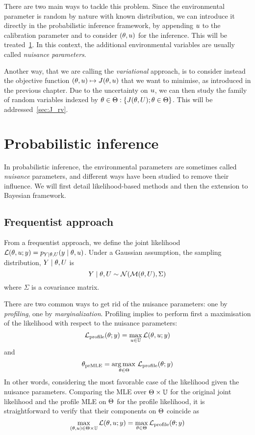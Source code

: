 \documentclass[../../Main_ManuscritThese.tex]{subfiles}
\begin{document}
There are two main ways to tackle this problem. Since the environmental parameter is random by nature with known distribution, we can introduce it directly in the probabilistic inference framework, by appending $u$ to the calibration parameter and to consider $(\theta, u)$ for the inference. This will be treated~\cref{sec:nuisance_parameters}. In this context, the additional environmental variables are usually called \emph{nuisance parameters}. 

Another way, that we are calling the \emph{variational} approach, is to consider instead the objective function $(\theta, u) \mapsto J(\theta, u)$ that we want to minimise, as introduced in the previous chapter. Due to the uncertainty on $u$, we can then study the family of random variables indexed by $\theta \in \Theta: \{J(\theta, U); \theta\in\Theta\}$. This will be addressed~\cref{sec:J_rv}.

\section{Probabilistic inference}
\label{sec:nuisance_parameters}
In probabilistic inference, the environmental parameters are sometimes called \emph{nuisance} parameters, and different ways have been studied to remove their influence.
We will first detail likelihood-based methods and then the extension to Bayesian framework.
\subsection{Frequentist approach}
From a frequentist approach, we define the joint likelihood $\mathcal{L}(\theta, u ;y) = p_{Y\mid \theta,U}(y \mid \theta, u)$.
Under a Gaussian assumption, the sampling distribution, $Y\mid \theta, U$ is 
\begin{equation}
Y \mid \theta, U \sim \mathcal{N}(\mathcal{M}(\theta, U), \Sigma)
\end{equation}
where $\Sigma$ is a covariance matrix.

There are two common ways to get rid of the nuisance parameters: one by \emph{profiling}, one by \emph{marginalization}.
Profiling implies to perform first a maximisation of the likelihood with respect to the nuisance parameters:
\begin{equation}
  \label{eq:def_profile_lik}
  \mathcal{L}_{\mathrm{profile}}(\theta;y) = \max_{u \in \mathbb{U}} \mathcal{L}(\theta,u;y)
\end{equation}
and
\begin{equation}
  {\theta}_{\mathrm{prMLE}} = \operatorname*{arg\,max \,}_{\theta\in\Theta} \mathcal{L}_{\mathrm{profile}}(\theta;y)
\end{equation}
In other words, considering the most favorable case of the likelihood given the nuisance parameters.
Comparing the MLE over $\Theta \times \mathbb{U}$ for the original joint likelihood and the profile MLE on $\Theta$ for the profile likelihood, it is straightforward to verify that their components on $\Theta$ coincide as
\begin{equation}
  \max_{(\theta ,u) \in \Theta\times \mathbb{U}} \mathcal{L}(\theta,u;y) = \max_{\theta\in \Theta} \mathcal{L}_{\mathrm{profile}}(\theta;y)
\end{equation}
\end{document}
